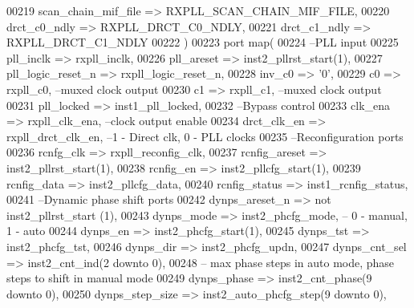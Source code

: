 \begin{DoxyCode}
00219       scan_chain_mif_file     => RXPLL_SCAN_CHAIN_MIF_FILE,
00220       drct_c0_ndly            => RXPLL_DRCT_C0_NDLY,
00221       drct_c1_ndly            => RXPLL_DRCT_C1_NDLY
00222    \textcolor{vhdlchar}{)}
00223    \textcolor{keywordflow}{port} \textcolor{keywordflow}{map}(
00224 \textcolor{keyword}{   --PLL input }
00225    pll_inclk         => rxpll_inclk,
00226    pll_areset        => inst2_pllrst_start\textcolor{vhdlchar}{(}\textcolor{vhdllogic}{1}\textcolor{vhdlchar}{)},
00227    pll_logic_reset_n => rxpll_logic_reset_n,
00228    inv_c0            => '0',
00229    c0                => rxpll_c0,\textcolor{keyword}{ --muxed clock output}
00230    c1                => rxpll_c1,\textcolor{keyword}{ --muxed clock output}
00231    pll_locked        => inst1_pll_locked,
00232 \textcolor{keyword}{   --Bypass control}
00233    clk_ena           => rxpll_clk_ena,\textcolor{keyword}{       --clock output enable}
00234    drct_clk_en       => rxpll_drct_clk_en,\textcolor{keyword}{   --1 - Direct clk, 0 - PLL clocks }
00235 \textcolor{keyword}{   --Reconfiguration ports}
00236    rcnfg_clk         => rxpll_reconfig_clk,
00237    rcnfig_areset     => inst2_pllrst_start\textcolor{vhdlchar}{(}\textcolor{vhdllogic}{1}\textcolor{vhdlchar}{)},
00238    rcnfig_en         => inst2_pllcfg_start\textcolor{vhdlchar}{(}\textcolor{vhdllogic}{1}\textcolor{vhdlchar}{)},
00239    rcnfig_data       => inst2_pllcfg_data,
00240    rcnfig_status     => inst1_rcnfig_status,
00241 \textcolor{keyword}{   --Dynamic phase shift ports}
00242    dynps_areset_n    => \textcolor{keywordflow}{not} inst2\_pllrst\_start \textcolor{vhdlchar}{(}\textcolor{vhdllogic}{1}\textcolor{vhdlchar}{)},
00243    dynps_mode        => inst2_phcfg_mode,\textcolor{keyword}{ -- 0 - manual, 1 - auto}
00244    dynps_en          => inst2_phcfg_start\textcolor{vhdlchar}{(}\textcolor{vhdllogic}{1}\textcolor{vhdlchar}{)},
00245    dynps_tst         => inst2_phcfg_tst,
00246    dynps_dir         => inst2_phcfg_updn,
00247    dynps_cnt_sel     => inst2_cnt_ind\textcolor{vhdlchar}{(}\textcolor{vhdllogic}{2} \textcolor{keywordflow}{downto} \textcolor{vhdllogic}{0}\textcolor{vhdlchar}{)},
00248 \textcolor{keyword}{   -- max phase steps in auto mode, phase steps to shift in manual mode}
00249    dynps_phase       => inst2_cnt_phase\textcolor{vhdlchar}{(}\textcolor{vhdllogic}{9} \textcolor{keywordflow}{downto} \textcolor{vhdllogic}{0}\textcolor{vhdlchar}{)},
00250    dynps_step_size   => inst2_auto_phcfg_step\textcolor{vhdlchar}{(}\textcolor{vhdllogic}{9} \textcolor{keywordflow}{downto} \textcolor{vhdllogic}{0}\textcolor{vhdlchar}{)},

\end{DoxyCode}
